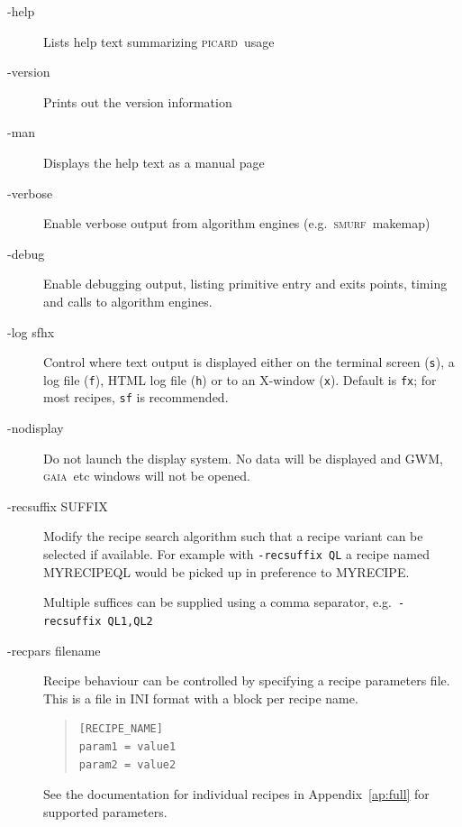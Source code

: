 \documentclass[twoside,11pt]{article}
\renewcommand{\_}{\texttt{\symbol{95}}}
\newenvironment{myquote}{\begin{quote}\begin{small}}{\end{small}\end{quote}}
\newcommand{\GAIA}{\textsc{gaia}}
\newcommand{\SMURF}{\textsc{smurf}}
\newcommand{\picard}{\textsc{picard}}
\newcommand{\task}[1]{\textsf{#1}}
\begin{document}
\begin{description}
\item[-help] \mbox{}

  Lists help text summarizing \picard\ usage

\item[-version] \mbox{}

  Prints out the version information

\item[-man] \mbox{}

  Displays the help text as a manual page

\item[-verbose] \mbox{}

  Enable verbose output from algorithm engines (e.g.\ \SMURF\ \task{makemap})

\item[-debug] \mbox{}

  Enable debugging output, listing primitive entry and exits points,
  timing and calls to algorithm engines.

\item[-log sfhx] \mbox{}

  Control where text output is displayed either on the terminal screen
  (\texttt{s}), a log file (\texttt{f}), HTML log file (\texttt{h}) or
  to an X-window (\texttt{x}). Default is \texttt{fx}; for most
  recipes, \texttt{sf} is recommended.

\item[-nodisplay] \mbox{}

  Do not launch the display system. No data will be displayed and GWM,
  \GAIA\ etc windows will not be opened.

\item[-recsuffix SUFFIX] \mbox{}

  Modify the recipe search algorithm such that a recipe variant can be
  selected if available. For example with \texttt{-recsuffix QL} a
  recipe named \task{MYRECIPE\_QL} would be picked up in preference to
  \task{MYRECIPE}.

  Multiple suffices can be supplied using a comma separator, e.g.\
  \texttt{-recsuffix QL1,QL2}

\item[-recpars filename] \mbox{}

  Recipe behaviour can be controlled by specifying a recipe parameters
  file. This is a file in INI format with a block per recipe name.
\begin{myquote}
\begin{verbatim}
[RECIPE_NAME]
param1 = value1
param2 = value2
\end{verbatim}
\end{myquote}
See the documentation for individual recipes in Appendix~\ref{ap:full}
for supported parameters.

\end{description}
\end{document}
